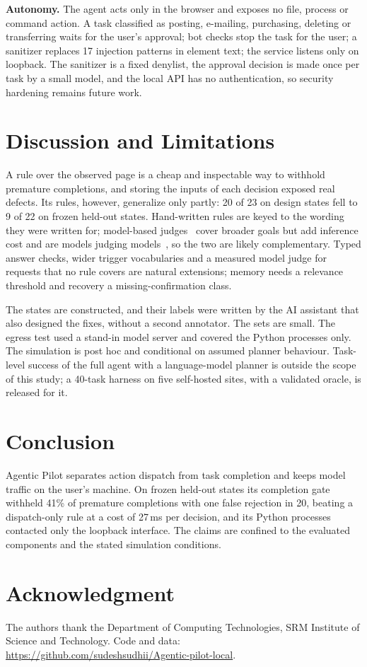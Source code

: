 \documentclass[conference]{IEEEtran}
\begin{document}
\textbf{Autonomy.} The agent acts only in the browser and exposes no file, process or command action. A task classified as posting, e-mailing, purchasing, deleting or transferring waits for the user's approval; bot checks stop the task for the user; a sanitizer replaces 17 injection patterns in element text; the service listens only on loopback. The sanitizer is a fixed denylist, the approval decision is made once per task by a small model, and the local API has no authentication, so security hardening remains future work.

\section{Discussion and Limitations}

A rule over the observed page is a cheap and inspectable way to withhold premature completions, and storing the inputs of each decision exposed real defects. Its rules, however, generalize only partly: 20 of 23 on design states fell to 9 of 22 on frozen held-out states. Hand-written rules are keyed to the wording they were written for; model-based judges~\cite{pan2024autonomous,sumyk2025done} cover broader goals but add inference cost and are models judging models~\cite{huang2024cannot}, so the two are likely complementary. Typed answer checks, wider trigger vocabularies and a measured model judge for requests that no rule covers are natural extensions; memory needs a relevance threshold and recovery a missing-confirmation class.

The states are constructed, and their labels were written by the AI assistant that also designed the fixes, without a second annotator. The sets are small. The egress test used a stand-in model server and covered the Python processes only. The simulation is post hoc and conditional on assumed planner behaviour. Task-level success of the full agent with a language-model planner is outside the scope of this study; a 40-task harness on five self-hosted sites, with a validated oracle, is released for it.

\section{Conclusion}

Agentic Pilot separates action dispatch from task completion and keeps model traffic on the user's machine. On frozen held-out states its completion gate withheld 41\% of premature completions with one false rejection in 20, beating a dispatch-only rule at a cost of 27\,ms per decision, and its Python processes contacted only the loopback interface. The claims are confined to the evaluated components and the stated simulation conditions.

\section*{Acknowledgment}
The authors thank the Department of Computing Technologies, SRM Institute of Science and Technology. Code and data: \url{https://github.com/sudeshsudhii/Agentic-pilot-local}.



\end{document}
